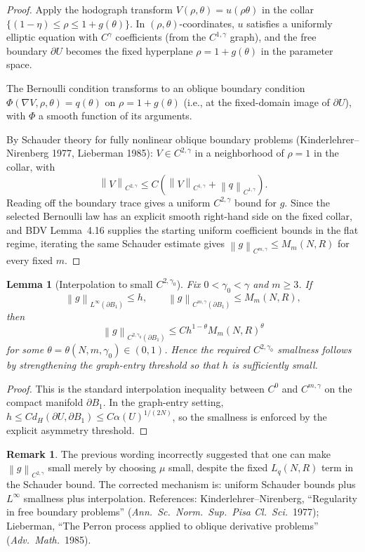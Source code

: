 \documentclass[11pt]{article}
\newtheorem{lemma}[theorem]{Lemma}
\theoremstyle{definition}
\newtheorem{remark}[theorem]{Remark}
\newcommand{\norm}[1]{\left\|#1\right\|}
\begin{document}
\begin{proof}
Apply the hodograph transform $V(\rho,\theta)=u(\rho\theta)$ in the collar
$\{(1-\eta)\le\rho\le1+g(\theta)\}$. In $(\rho,\theta)$-coordinates, $u$
satisfies a uniformly elliptic equation with $C^\gamma$ coefficients (from
the $C^{1,\gamma}$ graph), and the free boundary $\partial U$ becomes the
fixed hyperplane $\rho=1+g(\theta)$ in the parameter space.

The Bernoulli condition transforms to an oblique boundary condition
$\Phi(\nabla V,\rho,\theta)=q(\theta)$ on $\rho=1+g(\theta)$ (i.e., at the
fixed-domain image of $\partial U$), with $\Phi$ a smooth function of its
arguments.

By Schauder theory for fully nonlinear oblique boundary problems
(Kinderlehrer--Nirenberg 1977, Lieberman 1985):
$V\in C^{2,\gamma}$ in a neighborhood of $\rho=1$ in the collar, with
\[
\norm{V}_{C^{2,\gamma}}\le C(\norm{V}_{C^{1,\gamma}}+\norm{q}_{C^{1,\gamma}}).
\]
Reading off the boundary trace gives a uniform $C^{2,\gamma}$ bound for
$g$. Since the selected Bernoulli law has an explicit smooth right-hand side
on the fixed collar, and BDV Lemma~4.16 supplies the starting uniform
coefficient bounds in the flat regime, iterating the same Schauder estimate
gives $\norm{g}_{C^{m,\gamma}}\le M_m(N,R)$ for every fixed $m$.
\end{proof}

\begin{lemma}[Interpolation to small $C^{2,\gamma_0}$]\label{lem:interp}
Fix $0<\gamma_0<\gamma$ and $m\ge3$. If
\[
\norm{g}_{L^\infty(\partial B_1)}\le h,
\qquad
\norm{g}_{C^{m,\gamma}(\partial B_1)}\le M_m(N,R),
\]
then
\[
\norm{g}_{C^{2,\gamma_0}(\partial B_1)}
\le C h^{1-\theta}M_m(N,R)^\theta
\]
for some $\theta=\theta(N,m,\gamma_0)\in(0,1)$. Hence the required
$C^{2,\gamma_0}$ smallness follows by strengthening the graph-entry threshold
so that $h$ is sufficiently small.
\end{lemma}

\begin{proof}
This is the standard interpolation inequality between $C^0$ and
$C^{m,\gamma}$ on the compact manifold $\partial B_1$. In the graph-entry
setting, $h\le C d_H(\partial U,\partial B_1)\le
C\alpha(U)^{1/(2N)}$, so the smallness is enforced by the explicit
asymmetry threshold.
\end{proof}

\begin{remark}
The previous wording incorrectly suggested that one can make
$\norm{g}_{C^{2,\gamma}}$ small merely by choosing $\mu$ small, despite the
fixed $L_q(N,R)$ term in the Schauder bound. The corrected mechanism is:
uniform Schauder bounds plus $L^\infty$ smallness plus interpolation.
References:
Kinderlehrer--Nirenberg, ``Regularity in free boundary problems''
(\emph{Ann.\ Sc.\ Norm.\ Sup.\ Pisa Cl.\ Sci.}\ 1977); Lieberman, ``The
Perron process applied to oblique derivative problems''
(\emph{Adv.\ Math.}\ 1985).
\end{remark}
\end{document}
